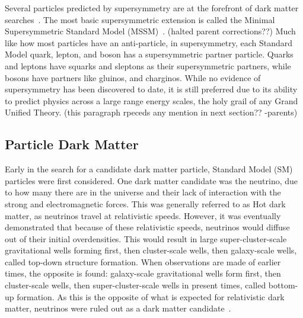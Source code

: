 Several particles predicted by supersymmetry are at the forefront of dark matter searches~\cite{Jungman:1995df}.
The most basic supersymmetric extension is called the Minimal Supersymmetric Standard Model (MSSM)~\cite{MSSM,supersym1}.
{\color{red}(halted parent corrections??)}
Much like how most particles have an anti-particle, in supersymmetry, each Standard Model quark, lepton, and boson has a supersymmetric partner particle.
Quarks and leptons have squarks and sleptons as their supersymmetric partners, while bosons have partners like gluinos, and charginos.
While no evidence of supersymmetry has been discovered to date, it is still preferred due to its ability to predict physics across a large range energy scales, the holy grail of any Grand Unified Theory.
{\color{red}(this paragraph rpeceds any mention in next section?? -parents)}


\subsection{Particle Dark Matter}\label{sec_particledm}

Early in the search for a candidate dark matter particle, Standard Model (SM) particles were first considered.
One dark matter candidate was the neutrino, due to how many there are in the universe and their lack of interaction with the strong and electromagnetic forces.
This was generally referred to as Hot dark matter, as neutrinos travel at relativistic speeds.
However, it was eventually demonstrated that because of these relativistic speeds, neutrinos would diffuse out of their initial overdensities.
This would result in large super-cluster-scale gravitational wells forming first, then cluster-scale wells, then galaxy-scale wells, called top-down structure formation.
When observations are made of earlier times, the opposite is found: galaxy-scale gravitational wells form first, then cluster-scale wells, then super-cluster-scale wells in present times, called bottom-up formation.
As this is the opposite of what is expected for relativistic dark matter, neutrinos were ruled out as a dark matter candidate~\cite{neutrinoHeirarchical}.


